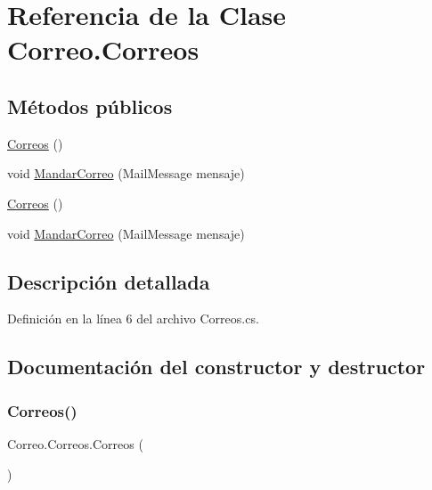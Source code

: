 \hypertarget{class_correo_1_1_correos}{}\section{Referencia de la Clase Correo.\+Correos}
\label{class_correo_1_1_correos}
\subsection*{Métodos públicos}
\begin{DoxyCompactItemize}
\item 
\mbox{\hyperlink{class_correo_1_1_correos_a291e48f8225e6b2f3f8d82a0ff292a35}{Correos}} ()
\item 
void \mbox{\hyperlink{class_correo_1_1_correos_af1d6303f7e2fa380b3476a766dd8474c}{Mandar\+Correo}} (Mail\+Message mensaje)
\item 
\mbox{\hyperlink{class_correo_1_1_correos_a291e48f8225e6b2f3f8d82a0ff292a35}{Correos}} ()
\item 
void \mbox{\hyperlink{class_correo_1_1_correos_af1d6303f7e2fa380b3476a766dd8474c}{Mandar\+Correo}} (Mail\+Message mensaje)
\end{DoxyCompactItemize}


\subsection{Descripción detallada}


Definición en la línea 6 del archivo Correos.\+cs.



\subsection{Documentación del constructor y destructor}
\mbox{\label{class_correo_1_1_correos_a291e48f8225e6b2f3f8d82a0ff292a35}} 
\subsubsection{\texorpdfstring{Correos()}{Correos()}\hspace{0.1cm}{\footnotesize\ttfamily [1/2]}}
{\footnotesize\ttfamily Correo.\+Correos.\+Correos (\begin{DoxyParamCaption}{ }\end{DoxyParamCaption})}



